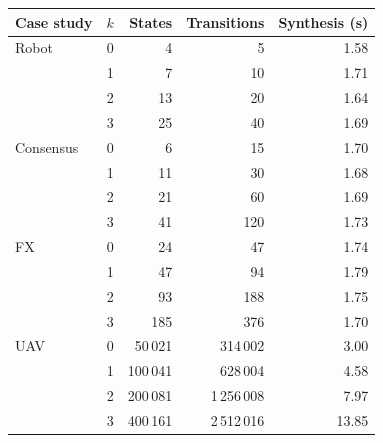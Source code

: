 \begin{tabular}{@{}lrrrr@{}}
\toprule
Case study & $k$ & States & Transitions & Synthesis (s)\\
\midrule
Robot & 0 & 4 & 5 & 1.58\\
 & 1 & 7 & 10 & 1.71\\
 & 2 & 13 & 20 & 1.64\\
 & 3 & 25 & 40 & 1.69\\
\midrule
Consensus & 0 & 6 & 15 & 1.70\\
 & 1 & 11 & 30 & 1.68\\
 & 2 & 21 & 60 & 1.69\\
 & 3 & 41 & 120 & 1.73\\
\midrule
FX & 0 & 24 & 47 & 1.74\\
 & 1 & 47 & 94 & 1.79\\
 & 2 & 93 & 188 & 1.75\\
 & 3 & 185 & 376 & 1.70\\
\midrule
UAV & 0 & 50\,021 & 314\,002 & 3.00\\
 & 1 & 100\,041 & 628\,004 & 4.58\\
 & 2 & 200\,081 & 1\,256\,008 & 7.97\\
 & 3 & 400\,161 & 2\,512\,016 & 13.85\\
\bottomrule
\end{tabular}
